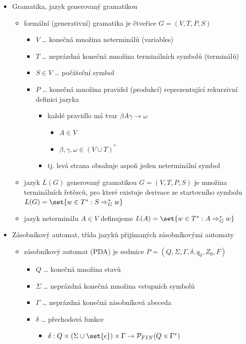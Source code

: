 \begin{itemize}
\item Gramatika, jazyk generovaný gramatikou
\begin{itemize}
\item formální (generativní) gramatika je čtveřice $G=(V,T,P,S)$
\begin{itemize}
\item $V$ \dots{} konečná množina neterminálů (variables)
\item $T$ \dots{} neprázdná konečná množina terminálních symbolů (terminálů)
\item $S\in V$ \dots{} počáteční symbol
\item $P$ \dots{} konečná množina pravidel (produkcí) reprezentující rekurzivní definici jazyka
\begin{itemize}
\item každé pravidlo má tvar $\beta A\gamma\to\omega$
\begin{itemize}
\item $A\in V$
\item $\beta,\gamma,\omega\in (V\cup T)^*$
\end{itemize}
\item tj. levá strana obsahuje aspoň jeden neterminální symbol
\end{itemize}
\end{itemize}
\item jazyk $L(G)$ generovaný gramatikou $G=(V,T,P,S)$ je množina terminálních řetězců, pro které existuje derivace ze startovního symbolu $L(G)=\set{w\in T^*: S\Rightarrow_G^* w}$
\item jazyk neterminálu $A\in V$ definujeme $L(A)=\set{w\in T^*: A\Rightarrow_G^* w}$
\end{itemize}
\item Zásobníkový automat, třída jazyků přijímaných zásobníkovými automaty
\begin{itemize}
\item zásobníkový automat (PDA) je sedmice $P=(Q,\Sigma,\Gamma,\delta,q_0,Z_0,F)$
\begin{itemize}
\item $Q$ \dots{} konečná množina stavů
\item $\Sigma$ \dots{} neprázdná konečná množina vstupních symbolů
\item $\Gamma$ \dots{} neprázdná konečná zásobníková abeceda
\item $\delta$ \dots{} přechodová funkce
\begin{itemize}
\item $\delta:Q\times(\Sigma\cup\set{\epsilon})\times\Gamma\to \mathcal P_{FIN}(Q\times\Gamma^*)$

\end{itemize}
\end{itemize}
\end{itemize}
\end{itemize}
